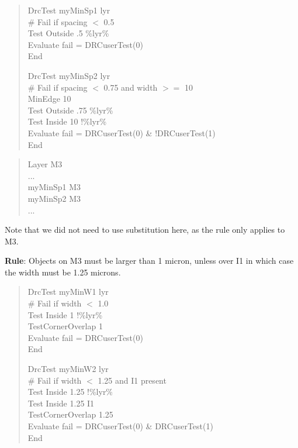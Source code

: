 \begin{quote}\rr\vt
DrcTest myMinSp1 lyr\\
\# Fail if spacing $<$ 0.5\\
Test Outside .5 \%lyr\%\\
Evaluate fail = DRCuserTest(0)\\
End

DrcTest myMinSp2 lyr\\
\# Fail if spacing $<$ 0.75 and width $>=$ 10\\
MinEdge 10\\
Test Outside .75 \%lyr\%\\
Test Inside 10 !\%lyr\%\\
Evaluate fail = DRCuserTest(0) \& !DRCuserTest(1)\\
End
\end{quote}

\begin{quote}\rr\vt
Layer M3\\
...\\
myMinSp1 M3\\
myMinSp2 M3\\
...\\
\end{quote}

Note that we did not need to use substitution here, as the rule only
applies to M3.

\begin{description}
\item{{\bf Rule}:  Objects on M3 must be larger than 1 micron, unless over
I1 in which case the width must be 1.25 microns.}
\end{description}

\begin{quote}\rr\vt
DrcTest myMinW1 lyr\\
\# Fail if width $<$ 1.0\\
Test Inside 1 !\%lyr\%\\
TestCornerOverlap 1\\
Evaluate fail = DRCuserTest(0)\\
End

DrcTest myMinW2 lyr\\
\# Fail if width $<$ 1.25 and I1 present\\
Test Inside 1.25 !\%lyr\%\\
Test Inside 1.25 I1\\
TestCornerOverlap 1.25\\
Evaluate fail = DRCuserTest(0) \& DRCuserTest(1)\\
End
\end{quote}

